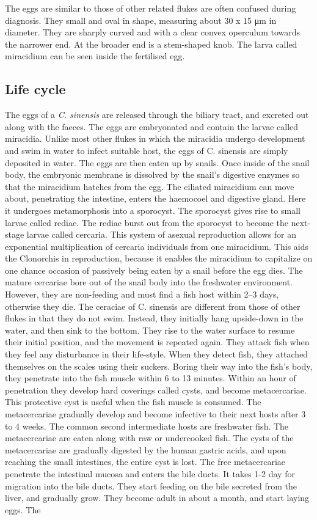 \documentclass[]{book}
\begin{document}
The eggs are similar to those of other related flukes are often confused during diagnosis. They small and oval in shape, measuring about 30 x 15 μm in diameter. They are sharply curved and with a clear convex operculum towards the narrower end. At the broader end is a stem-shaped knob. The larva called miracidium can be seen inside the fertilised egg.

\hypertarget{life-cycle-3}{%
\subsection{Life cycle}\label{life-cycle-3}}

The eggs of a \emph{C. sinensis} are released through the biliary tract, and excreted out along with the faeces. The eggs are embryonated and contain the larvae called miracidia. Unlike most other flukes in which the miracidia undergo development and swim in water to infect suitable host, the eggs of C. sinensis are simply deposited in water. The eggs are then eaten up by snails. Once inside of the snail body, the embryonic membrane is dissolved by the snail's digestive enzymes so that the miracidium hatches from the egg. The ciliated miracidium can move about, penetrating the intestine, enters the haemocoel and digestive gland. Here it undergoes metamorphosis into a sporocyst. The sporocyst gives rise to small larvae called rediae. The rediae burst out from the sporocyst to become the next-stage larvae called cercaria. This system of asexual reproduction allows for an exponential multiplication of cercaria individuals from one miracidium. This aids the Clonorchis in reproduction, because it enables the miracidium to capitalize on one chance occasion of passively being eaten by a snail before the egg dies. The mature cercariae bore out of the snail body into the freshwater environment. However, they are non-feeding and must find a fish host within 2--3 days, otherwise they die. The ceraciae of C. sinensis are different from those of other flukes in that they do not swim. Instead, they initially hang upside-down in the water, and then sink to the bottom. They rise to the water surface to resume their initial position, and the movement is repeated again. They attack fish when they feel any disturbance in their life-style. When they detect fish, they attached themselves on the scales using their suckers. Boring their way into the fish's body, they penetrate into the fish muscle within 6 to 13 minutes. Within an hour of penetration they develop hard coverings called cysts, and become metacercariae. This protective cyst is useful when the fish muscle is consumed. The metacercariae gradually develop and become infective to their next hosts after 3 to 4 weeks. The common second intermediate hosts are freshwater fish. The metacercariae are eaten along with raw or undercooked fish. The cysts of the metacercariae are gradually digested by the human gastric acids, and upon reaching the small intestines, the entire cyst is lost. The free metacercariae penetrate the intestinal mucosa and enters the bile ducts. It takes 1-2 day for migration into the bile ducts. They start feeding on the bile secreted from the liver, and gradually grow. They become adult in about a month, and start laying eggs. The 
\end{document}
